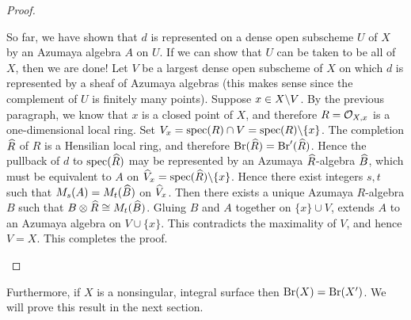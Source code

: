 \begin{proof}
\begin{enumerate}
So far, we have shown that $d$ is represented on a dense open subscheme $U$ of $X$ by an Azumaya algebra $A$ on $U$.  If we can show that $U$ can be taken to be all of $X$, then we are done!  Let $V$ be a largest dense open subscheme of $X$ on which $d$ is represented by a sheaf of Azumaya algebras (this makes sense since the complement of $U$ is finitely many points).  Suppose $x\in X\backslash V$.  By the previous paragraph, we know that $x$ is a closed point of $X$, and therefore $R = \mathcal{O}_{X,x}$ is a one-dimensional local ring.  Set $V_x = \textnormal{spec}(R)\cap V = \textnormal{spec}(R)\backslash\{x\}$.  The completion $\widehat R$ of $R$ is a Hensilian local ring, and therefore $\textnormal{Br}(\widehat R) = \textnormal{Br}'(\widehat R)$.  Hence the pullback of $d$ to $\textnormal{spec}(\widehat R)$ may be represented by an Azumaya $\widehat R$-algebra $\widehat B$, which must be equivalent to $A$ on $\widehat V_x = \textnormal{spec}(\widehat R)\backslash \{x\}$.  Hence there exist integers $s,t$ such that $M_s(A) = M_t(\widehat B)$ on $\widehat V_x$.  Then there exists a unique Azumaya $R$-algebra $B$ such that $B\otimes\widehat R \cong M_t(\widehat B)$.  Gluing $B$ and $A$ together on $\{x\}\cup V$, extends $A$ to an Azumaya algebra on $V\cup \{x\}$.  This contradicts the maximality of $V$, and hence $V = X$.  This completes the proof.
\end{enumerate}
\end{proof}

Furthermore, if $X$ is a nonsingular, integral surface then $\textnormal{Br}(X) = \textnormal{Br}(X')$.  We will prove this result in the next section.


